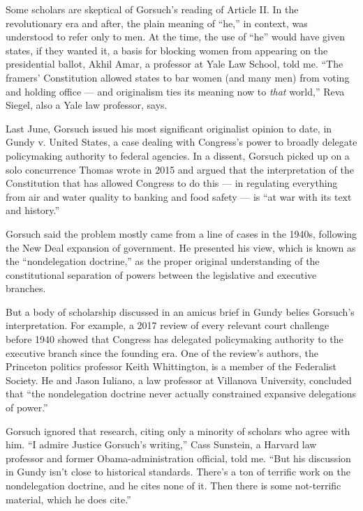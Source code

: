 Some scholars are skeptical of Gorsuch's reading of Article II. In the
revolutionary era and after, the plain meaning of ``he,'' in context,
was understood to refer only to men. At the time, the use of ``he''
would have given states, if they wanted it, a basis for blocking women
from appearing on the presidential ballot, Akhil Amar, a professor at
Yale Law School, told me. ``The framers' Constitution allowed states to
bar women (and many men) from voting and holding office --- and
originalism ties its meaning now to \emph{that} world,'' Reva Siegel,
also a Yale law professor, says.

Last June, Gorsuch issued his most significant originalist opinion to
date, in Gundy v. United States, a case dealing with Congress's power to
broadly delegate policymaking authority to federal agencies. In a
dissent, Gorsuch picked up on a solo concurrence Thomas wrote in 2015
and argued that the interpretation of the Constitution that has allowed
Congress to do this --- in regulating everything from air and water
quality to banking and food safety --- is ``at war with its text and
history.''

Gorsuch said the problem mostly came from a line of cases in the 1940s,
following the New Deal expansion of government. He presented his view,
which is known as the ``nondelegation doctrine,'' as the proper original
understanding of the constitutional separation of powers between the
legislative and executive branches.

But a body of scholarship discussed in an amicus brief in Gundy belies
Gorsuch's interpretation. For example, a 2017 review of every relevant
court challenge before 1940 showed that Congress has delegated
policymaking authority to the executive branch since the founding era.
One of the review's authors, the Princeton politics professor Keith
Whittington, is a member of the Federalist Society. He and Jason
Iuliano, a law professor at Villanova University, concluded that ``the
nondelegation doctrine never actually constrained expansive delegations
of power.''

Gorsuch ignored that research, citing only a minority of scholars who
agree with him. ``I admire Justice Gorsuch's writing,'' Cass Sunstein, a
Harvard law professor and former Obama-administration official, told me.
``But his discussion in Gundy isn't close to historical standards.
There's a ton of terrific work on the nondelegation doctrine, and he
cites none of it. Then there is some not-terrific material, which he
does cite.''

